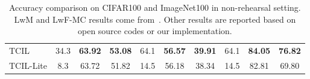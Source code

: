 \documentclass[letterpaper]{article} \usepackage{aaai23}  \usepackage{times}  \usepackage{helvet}  \usepackage{courier}  \usepackage[hyphens]{url}  \usepackage{graphicx} \urlstyle{rm} \def\UrlFont{\rm}  \usepackage{natbib}  \usepackage{caption} \frenchspacing  \setlength{\pdfpagewidth}{8.5in}  \setlength{\pdfpageheight}{11in}  \usepackage{algorithm}
\begin{document}
\begin{table}
{\begin{tabular}{@{}l|cccccc|ccc@{}}
TCIL                                                   & 34.3             & \textbf{63.92} & \multicolumn{1}{c|}{\textbf{53.08}} & 64.1             & \textbf{56.57} & \textbf{39.91} & 64.1             & \textbf{84.05} & \textbf{76.82} \\
TCIL-Lite                                              & 8.3              & 63.72          & \multicolumn{1}{c|}{51.82}          & 14.5             & 56.18          & 38.34          & 14.5             & 82.81          & 69.80          \\ \bottomrule
\end{tabular}
}
\caption{Accuracy comparison on CIFAR100 and ImageNet100 in non-rehearsal setting. LwM and LwF-MC results come from~\cite{p24}. Other results are reported based on open source codes or our implementation.}
\label{mem_free}
\end{table}
\end{document}

